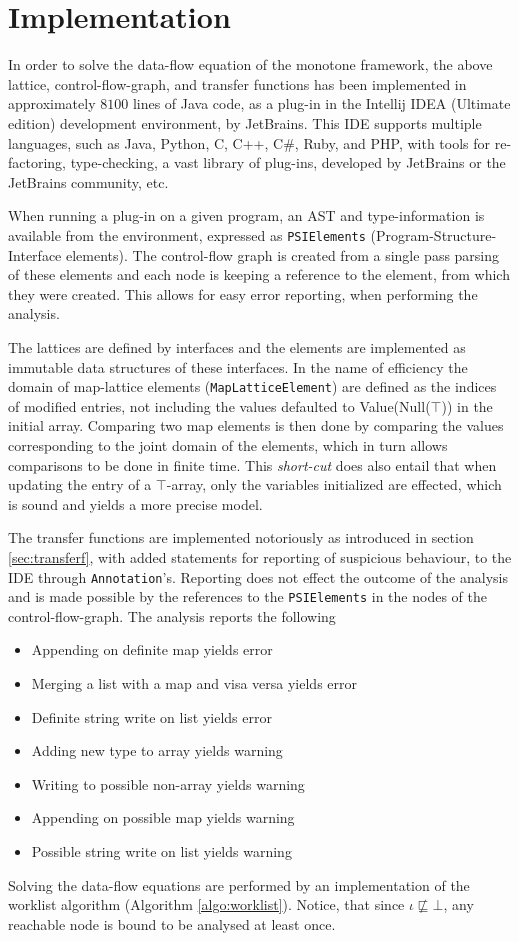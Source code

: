 \section{Implementation}
\label{sec:worklist}
In order to solve the data-flow equation of the monotone framework, the above lattice, control-flow-graph, and transfer functions has been implemented in approximately $8100$ lines of Java code, as a plug-in in the Intellij IDEA (Ultimate edition) development environment, by JetBrains. This IDE supports multiple languages, such as Java, Python, C, C++, C\#, Ruby, and PHP, with tools for re-factoring, type-checking, a vast library of plug-ins, developed by JetBrains or the JetBrains community, etc. 

When running a plug-in on a given program, an AST and type-information is available from the environment, expressed as \texttt{PSIElements} (Program-Structure-Interface elements).  The control-flow graph is created from a single pass parsing of these elements and each node is keeping a reference to the element, from which they were created. This allows for easy error reporting, when performing the analysis. 

The lattices are defined by interfaces and the elements are implemented as immutable data structures of these interfaces. In the name of efficiency the domain of map-lattice elements (\texttt{MapLatticeElement}) are defined as the indices of modified entries, not including the values defaulted to Value(Null($\top$)) in the initial array. Comparing two map elements is then done by comparing the values corresponding to the joint domain of the elements, which in turn allows comparisons to be done in finite time. This \emph{short-cut} does also entail that when updating the entry of a $\top$-array, only the variables initialized are effected, which is sound and yields a more precise model.

The transfer functions are implemented notoriously as introduced in section \ref{sec:transferf}, with added statements for reporting of suspicious behaviour, to the IDE through \texttt{Annotation}'s. Reporting does not effect the outcome of the analysis and is made possible by the references to the \texttt{PSIElements} in the nodes of the control-flow-graph. The analysis reports the following
\begin{itemize}
\item Appending on definite map yields error
\item Merging a list with a map and visa versa yields error
\item Definite string write on list yields error
\item Adding new type to array yields warning
\item Writing to possible non-array yields warning
\item Appending on possible map yields warning
\item Possible string write on list yields warning
\end{itemize}
Solving the data-flow equations are performed by an implementation of the worklist algorithm (Algorithm \ref{algo:worklist}). Notice, that since $\iota \not\sqsubseteq \bot$, any reachable node is bound to be analysed at least once. 

